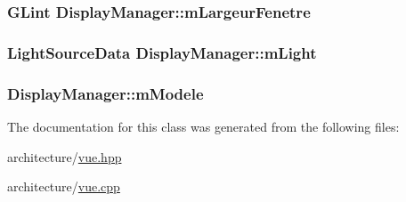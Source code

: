 \subsubsection[{\texorpdfstring{m\+Largeur\+Fenetre}{mLargeurFenetre}}]{\setlength{\rightskip}{0pt plus 5cm}G\+Lint Display\+Manager\+::m\+Largeur\+Fenetre}\hypertarget{class_display_manager_a7078a2a1023ebe660ce2e3007a988a62}{}\label{class_display_manager_a7078a2a1023ebe660ce2e3007a988a62}
\subsubsection[{\texorpdfstring{m\+Light}{mLight}}]{\setlength{\rightskip}{0pt plus 5cm}Light\+Source\+Data Display\+Manager\+::m\+Light}\hypertarget{class_display_manager_a012e14f7761f19a3d049aae93f5d694b}{}\label{class_display_manager_a012e14f7761f19a3d049aae93f5d694b}
\subsubsection[{\texorpdfstring{m\+Modele}{mModele}}]{ Display\+Manager\+::m\+Modele}\hypertarget{class_display_manager_a0c8ba3fe8aece87fc924847fc8958398}{}\label{class_display_manager_a0c8ba3fe8aece87fc924847fc8958398}


The documentation for this class was generated from the following files\+:\begin{DoxyCompactItemize}
\item 
architecture/\hyperlink{vue_8hpp}{vue.\+hpp}\item 
architecture/\hyperlink{vue_8cpp}{vue.\+cpp}\end{DoxyCompactItemize}

